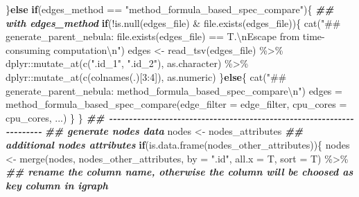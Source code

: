 \documentclass[
]{article}
\newenvironment{Shaded}{\begin{snugshade}}{\end{snugshade}}
\newcommand{\AttributeTok}[1]{\textcolor[rgb]{0.77,0.63,0.00}{#1}}
\newcommand{\ControlFlowTok}[1]{\textcolor[rgb]{0.13,0.29,0.53}{\textbf{#1}}}
\newcommand{\DecValTok}[1]{\textcolor[rgb]{0.00,0.00,0.81}{#1}}
\newcommand{\DocumentationTok}[1]{\textcolor[rgb]{0.56,0.35,0.01}{\textbf{\textit{#1}}}}
\newcommand{\FunctionTok}[1]{\textcolor[rgb]{0.00,0.00,0.00}{#1}}
\newcommand{\NormalTok}[1]{#1}
\newcommand{\OtherTok}[1]{\textcolor[rgb]{0.56,0.35,0.01}{#1}}
\newcommand{\SpecialCharTok}[1]{\textcolor[rgb]{0.00,0.00,0.00}{#1}}
\newcommand{\StringTok}[1]{\textcolor[rgb]{0.31,0.60,0.02}{#1}}
\begin{document}
\begin{Shaded}
\begin{Highlighting}[]
\NormalTok{    \}}\ControlFlowTok{else} \ControlFlowTok{if}\NormalTok{(edges\_method }\SpecialCharTok{==} \StringTok{"method\_formula\_based\_spec\_compare"}\NormalTok{)\{}
      \DocumentationTok{\#\# with edges\_method}
      \ControlFlowTok{if}\NormalTok{(}\SpecialCharTok{!}\FunctionTok{is.null}\NormalTok{(edges\_file) }\SpecialCharTok{\&} \FunctionTok{file.exists}\NormalTok{(edges\_file))\{}
        \FunctionTok{cat}\NormalTok{(}\StringTok{"\#\# generate\_parent\_nebula: file.exists(edges\_file) == T.}\SpecialCharTok{\textbackslash{}n}\StringTok{Escape from time{-}consuming computation}\SpecialCharTok{\textbackslash{}n}\StringTok{"}\NormalTok{)}
\NormalTok{        edges }\OtherTok{\textless{}{-}} \FunctionTok{read\_tsv}\NormalTok{(edges\_file) }\SpecialCharTok{\%\textgreater{}\%}
\NormalTok{          dplyr}\SpecialCharTok{::}\FunctionTok{mutate\_at}\NormalTok{(}\FunctionTok{c}\NormalTok{(}\StringTok{".id\_1"}\NormalTok{, }\StringTok{".id\_2"}\NormalTok{), as.character) }\SpecialCharTok{\%\textgreater{}\%}
\NormalTok{          dplyr}\SpecialCharTok{::}\FunctionTok{mutate\_at}\NormalTok{(}\FunctionTok{c}\NormalTok{(}\FunctionTok{colnames}\NormalTok{(.)[}\DecValTok{3}\SpecialCharTok{:}\DecValTok{4}\NormalTok{]), as.numeric)}
\NormalTok{      \}}\ControlFlowTok{else}\NormalTok{\{}
        \FunctionTok{cat}\NormalTok{(}\StringTok{"\#\# generate\_parent\_nebula: method\_formula\_based\_spec\_compare}\SpecialCharTok{\textbackslash{}n}\StringTok{"}\NormalTok{)}
\NormalTok{        edges }\OtherTok{=} \FunctionTok{method\_formula\_based\_spec\_compare}\NormalTok{(}\AttributeTok{edge\_filter =}\NormalTok{ edge\_filter, }\AttributeTok{cpu\_cores =}\NormalTok{ cpu\_cores, ...)}
\NormalTok{      \}}
\NormalTok{    \}}
    \DocumentationTok{\#\# {-}{-}{-}{-}{-}{-}{-}{-}{-}{-}{-}{-}{-}{-}{-}{-}{-}{-}{-}{-}{-}{-}{-}{-}{-}{-}{-}{-}{-}{-}{-}{-}{-}{-}{-}{-}{-}{-}{-}{-}{-}{-}{-}{-}{-}{-}{-}{-}{-}{-}{-}{-}{-}{-}{-}{-}{-}{-}{-}{-}{-}{-}{-}{-}{-}{-}{-}{-}{-}{-} }
    \DocumentationTok{\#\# generate nodes data}
\NormalTok{    nodes }\OtherTok{\textless{}{-}}\NormalTok{ nodes\_attributes}
    \DocumentationTok{\#\# additional nodes attributes}
    \ControlFlowTok{if}\NormalTok{(}\FunctionTok{is.data.frame}\NormalTok{(nodes\_other\_attributes))\{}
\NormalTok{      nodes }\OtherTok{\textless{}{-}} \FunctionTok{merge}\NormalTok{(nodes, nodes\_other\_attributes, }\AttributeTok{by =} \StringTok{".id"}\NormalTok{, }\AttributeTok{all.x =}\NormalTok{ T, }\AttributeTok{sort =}\NormalTok{ T) }\SpecialCharTok{\%\textgreater{}\%}
        \DocumentationTok{\#\# rename the column name, otherwise the column will be choosed as key column in igraph}

\end{Highlighting}
\end{Shaded}
\end{document}
